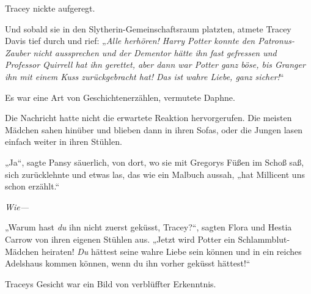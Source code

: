 Tracey nickte aufgeregt.

Und sobald sie in den Slytherin-Gemeinschaftsraum platzten, atmete Tracey Davis tief durch und rief: „\emph{Alle herhören! Harry Potter konnte den Patronus-Zauber nicht aussprechen und der Dementor hätte ihn fast gefressen und Professor Quirrell hat ihn gerettet, aber dann war Potter ganz böse, bis Granger ihn mit einem Kuss zurückgebracht hat! Das ist wahre Liebe, ganz sicher!}“

Es war eine Art von Geschichtenerzählen, vermutete Daphne.

Die Nachricht hatte nicht die erwartete Reaktion hervorgerufen. Die meisten Mädchen sahen hinüber und blieben dann in ihren Sofas, oder die Jungen lasen einfach weiter in ihren Stühlen.

„Ja“, sagte Pansy säuerlich, von dort, wo sie mit Gregorys Füßen im Schoß saß, sich zurücklehnte und etwas las, das wie ein Malbuch aussah, „hat Millicent uns schon erzählt.“

\emph{Wie—}

„Warum hast \emph{du} ihn nicht zuerst geküsst, Tracey?“, sagten Flora und Hestia Carrow von ihren eigenen Stühlen aus. „Jetzt wird Potter ein Schlammblut-Mädchen heiraten! \emph{Du} hättest seine wahre Liebe sein können und in ein reiches Adelshaus kommen können, wenn du ihn vorher geküsst hättest!“

Traceys Gesicht war ein Bild von verblüffter Erkenntnis.

